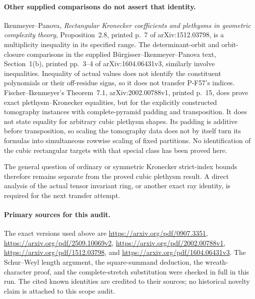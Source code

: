 \paragraph{Other supplied comparisons do not assert that identity.}
Ikenmeyer--Panova, \emph{Rectangular Kronecker coefficients
and plethysms in geometric complexity theory},
Proposition~2.8, printed p.~7 of arXiv:1512.03798,
is a multiplicity inequality in its specified range.
The determinant-orbit and orbit-closure comparisons in
the supplied B\"urgisser--Ikenmeyer--Panova text,
Section~1(b), printed pp.~3--4 of arXiv:1604.06431v3,
similarly involve inequalities.  Inequality of actual values does
not identify the constituent polynomials or their
off-residue signs, so it does not transfer P-F57's indices.
Fischer--Ikenmeyer's Theorem~7.1, arXiv:2002.00788v1,
printed p.~15, does prove exact plethysm--Kronecker
equalities, but for the explicitly constructed tomography
instances with complete-pyramid padding and transposition.
It does not state equality for arbitrary cubic plethysm
shapes.  Its padding is additive before transposition,
so scaling the tomography data does not by itself turn
its formulas into simultaneous rowwise scaling of fixed
partitions.  No identification of the cubic rectangular
targets with that special class has been proved here.

The general question of ordinary or symmetric Kronecker
strict-index bounds therefore remains separate from the
proved cubic plethysm result.  A direct analysis of the
actual tensor invariant ring, or another exact ray identity,
is required for the next transfer attempt.

\paragraph{Primary sources for this audit.}
The exact versions used above are
\url{https://arxiv.org/pdf/0907.3351},
\url{https://arxiv.org/pdf/2509.10069v2},
\url{https://arxiv.org/pdf/2002.00788v1},
\url{https://arxiv.org/pdf/1512.03798}, and
\url{https://arxiv.org/pdf/1604.06431v3}.
The Schur--Weyl length argument, the square-summand deduction,
the wreath-character proof, and the complete-stretch
substitution were checked in full in this run.  The cited
known identities are credited to their sources; no
historical novelty claim is attached to this scope audit.
